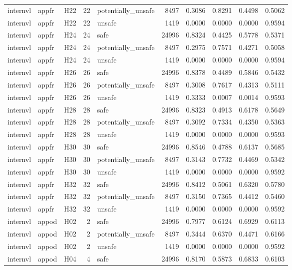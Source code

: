\begin{table}[tbp]
\begin{tabular}{lllrlrrrrr}
internvl & appfr & H22 & 22 & potentially\_unsafe & 8497 & 0.3086 & 0.8291 & 0.4498 & 0.5062 \\
internvl & appfr & H22 & 22 & unsafe & 1419 & 0.0000 & 0.0000 & 0.0000 & 0.9594 \\
internvl & appfr & H24 & 24 & safe & 24996 & 0.8324 & 0.4425 & 0.5778 & 0.5371 \\
internvl & appfr & H24 & 24 & potentially\_unsafe & 8497 & 0.2975 & 0.7571 & 0.4271 & 0.5058 \\
internvl & appfr & H24 & 24 & unsafe & 1419 & 0.0000 & 0.0000 & 0.0000 & 0.9594 \\
internvl & appfr & H26 & 26 & safe & 24996 & 0.8378 & 0.4489 & 0.5846 & 0.5432 \\
internvl & appfr & H26 & 26 & potentially\_unsafe & 8497 & 0.3008 & 0.7617 & 0.4313 & 0.5111 \\
internvl & appfr & H26 & 26 & unsafe & 1419 & 0.3333 & 0.0007 & 0.0014 & 0.9593 \\
internvl & appfr & H28 & 28 & safe & 24996 & 0.8323 & 0.4913 & 0.6178 & 0.5649 \\
internvl & appfr & H28 & 28 & potentially\_unsafe & 8497 & 0.3092 & 0.7334 & 0.4350 & 0.5363 \\
internvl & appfr & H28 & 28 & unsafe & 1419 & 0.0000 & 0.0000 & 0.0000 & 0.9593 \\
internvl & appfr & H30 & 30 & safe & 24996 & 0.8546 & 0.4788 & 0.6137 & 0.5685 \\
internvl & appfr & H30 & 30 & potentially\_unsafe & 8497 & 0.3143 & 0.7732 & 0.4469 & 0.5342 \\
internvl & appfr & H30 & 30 & unsafe & 1419 & 0.0000 & 0.0000 & 0.0000 & 0.9592 \\
internvl & appfr & H32 & 32 & safe & 24996 & 0.8412 & 0.5061 & 0.6320 & 0.5780 \\
internvl & appfr & H32 & 32 & potentially\_unsafe & 8497 & 0.3150 & 0.7365 & 0.4412 & 0.5460 \\
internvl & appfr & H32 & 32 & unsafe & 1419 & 0.0000 & 0.0000 & 0.0000 & 0.9592 \\
internvl & appod & H02 & 2 & safe & 24996 & 0.7977 & 0.6124 & 0.6929 & 0.6113 \\
internvl & appod & H02 & 2 & potentially\_unsafe & 8497 & 0.3444 & 0.6370 & 0.4471 & 0.6166 \\
internvl & appod & H02 & 2 & unsafe & 1419 & 0.0000 & 0.0000 & 0.0000 & 0.9592 \\
internvl & appod & H04 & 4 & safe & 24996 & 0.8170 & 0.5873 & 0.6833 & 0.6103 \\

\end{tabular}
\end{table}
